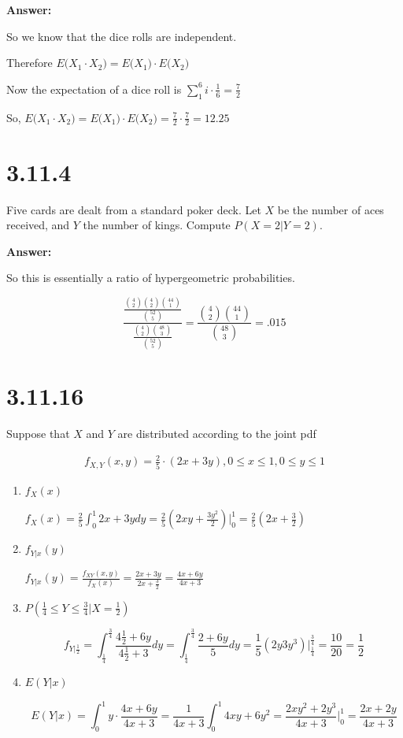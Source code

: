 \documentclass[svgnames]{article}
\begin{document}
\textbf{Answer:}

So we know that the dice rolls are independent.

Therefore $E\Big(X_1 \cdot X_2\Big)=E\Big(X_1\Big) \cdot E\Big(X_2\Big)$ 

Now the expectation of a dice roll is $\sum_{1}^{6}i\cdot\frac{1}{6}=\frac{7}{2}$

So, $E\Big(X_1 \cdot X_2\Big)=E\Big(X_1\Big) \cdot E\Big(X_2\Big)= \frac{7}{2}\cdot \frac{7}{2}=12.25$ 

\section{3.11.4}
Five cards are dealt from a standard poker deck. Let $X$ be the number of aces received, and $Y$ the number of kings. Compute $P(X = 2|Y = 2)$.

\textbf{Answer:}

So this is essentially a ratio of hypergeometric probabilities.

$$\frac{\frac{\binom{4}{2}\binom{4}{2}\binom{44}{1}}{\binom{52}{5}}}{\frac{\binom{4}{2}\binom{48}{3}}{\binom{52}{5}}}=\frac{\binom{4}{2}\binom{44}{1}}{\binom{48}{3}}=.015$$

\section{3.11.16}
 Suppose that $X$ and $Y$ are distributed according to the joint pdf
 
 \begin{align*}
 f_{X,Y}(x,y) = \frac{2}{5} \cdot (2x + 3y), 0 \leq x \leq 1, 0 \leq y \leq 1
 \end{align*}
 
 \begin{enumerate}[label=(\alph*)]
 \item $f_X(x)$
 
 $f_X(x)=\frac{2}{5}\int_{0}^{1}2x+3y dy = \frac{2}{5}(2xy +\frac{3y^2}{2})\Big|^{1}_{0}=\frac{2}{5}(2x+\frac{3}{2})$
 \item $f_{Y|x}(y)$
 
 $f_{Y|x}(y)=\frac{f_{XY}(x,y)}{f_X(x)}=\frac{2x+3y}{2x+\frac{3}{2}}=\frac{4x+6y}{4x+3}$

 \item $P(\frac{1}{4} \leq Y \leq \frac{3}{4} | X = \frac{1}{2})$
 
 $$f_{Y|\frac{1}{2}}=\int_{\frac{1}{4}}^{\frac{3}{4}}\frac{4\frac{1}{2}+6y}{4\frac{1}{2}+3}dy=\int_{\frac{1}{4}}^{\frac{3}{4}}\frac{2+6y}{5}dy=\frac{1}{5}(2y 3y^3)\Big|^{\frac{3}{4}}_{\frac{1}{4}}=\frac{10}{20}=\frac{1}{2}$$
 
 \item $E(Y|x)$
 
$$E(Y|x) = \int_{0}^{1}y\cdot\frac{4x+6y}{4x+3}=\frac{1}{4x+3}\int_{0}^{1}4xy+6y^2=\frac{2xy^2+2y^3}{4x+3}\Big|^{1}_{0}=\frac{2x+2y}{4x+3}$$
 
 \end{enumerate}
 
\end{document}
